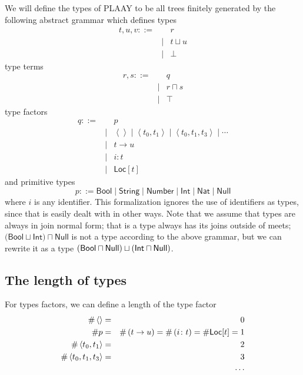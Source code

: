 \documentclass[12pt]{article}
\begin{document}
We will define the types of PLAAY to be all trees finitely generated by the
following abstract grammar which defines types%
\begin{eqnarray*}
t,u,v::= &&r \\
&\mid &t\sqcup u \\
&\mid &\bot
\end{eqnarray*}%
type terms%
\begin{eqnarray*}
r,s::= &&q \\
&\mid &r\sqcap s \\
&\mid &\top
\end{eqnarray*}%
type factors%
\begin{eqnarray*}
q::= &&p \\
&\mid &\left\langle {}\right\rangle \mid \left\langle
t_{0},t_{1}\right\rangle \mid \left\langle t_{0},t_{1},t_{3}\right\rangle
\mid \cdots \\
&\mid &t\rightarrow u \\
&\mid &i\colon t \\
&\mid &\mathsf{Loc}[t]
\end{eqnarray*}%
and primitive types%
\begin{equation*}
p::=\mathsf{Bool\mid String\mid Number}\mid \mathsf{Int}\mid \mathsf{Nat}%
\mid \mathsf{Null}
\end{equation*}%
where $i$ is any identifier. This formalization ignores the use of
identifiers as types, since that is easily dealt with in other ways. Note
that we assume that types are always in join normal form; that is a type
always has its joins outside of meets; $(\mathsf{Bool}\sqcup \mathsf{Int}%
\mathrm{)}\sqcap \mathsf{Null}$ is not a type according to the above
grammar, but we can rewrite it as a type $\left( \mathsf{Bool}\sqcap \mathsf{%
Null}\right) \sqcup \left( \mathsf{Int}\sqcap \mathsf{Null}\right) $.

\subsection{The length of types}

For types factors, we can define a length of the type factor%
\begin{eqnarray*}
\#\left\langle {}\right\rangle &=&0 \\
\#p &=&\#\left( t\rightarrow u\right) =\#\left( i\colon t\right) =\#\mathsf{%
Loc}[t]=1 \\
\#\left\langle t_{0},t_{1}\right\rangle &=&2 \\
\#\left\langle t_{0},t_{1},t_{3}\right\rangle &=&3 \\
&&\cdots
\end{eqnarray*}
\end{document}
